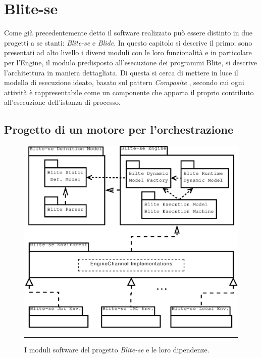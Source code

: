 \chapter{Blite-se}

Come già precedentemente detto il software realizzato può essere distinto
in due progetti a se stanti: \emph{Blite-se} e \emph{Blide}. In questo capitolo
si descrive il primo; sono presentati ad alto livello i diversi
moduli con le loro funzionalità e in particolare per l'Engine, il modulo predisposto all'esecuzione dei programmi
Blite, si descrive l'architettura in maniera dettagliata. Di questa si cerca di
mettere in luce il modello di esecuzione ideato, basato sul pattern
\emph{Composite} \cite{GANGo4}, secondo cui ogni attività è rappresentabile
come un componente che apporta il proprio contributo all'esecuzione dell'istanza di processo.

\section{Progetto di un motore per l'orchestrazione}

\label{sec:progmot}
\begin{figure}[t]
\begin{center}
\includegraphics[scale=0.50]
{architettura_interna/dia/BliteModule}
\caption[I moduli di Blite-se] {I moduli software del progetto \emph{Blite-se}
e le loro dipendenze.}
\rule{7cm}{0.01cm}
  \label{fig:modules}
\end{center}
\end{figure}

